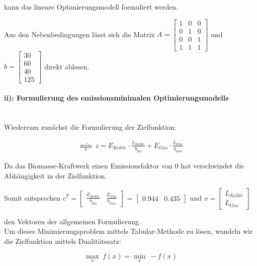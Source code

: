 \documentclass{eegreport}
\begin{document}
kann das lineare Optimierungsmodell formuliert werden.

Aus den Nebenbedingungen lässt sich die Matrix $A=\begin{bmatrix}
1 & 0 & 0 \\ 
0 & 1 & 0 \\ 
0 & 0 & 1 \\ 
1 & 1 & 1
\end{bmatrix}$ und $b=\begin{bmatrix}
30 \\ 
60 \\ 
40 \\ 
125
\end{bmatrix}$ direkt ablesen.




\paragraph{ii): Formulierung des emissionsminimalen Optimierungsmodells}\mbox{}\\


Wiederrum zunächst die Formulierung der Zielfunktion: 



\begin{align}
\min_{x}\ z = E_{Kohle} \cdot \frac{L_{Kohle}}{\eta_{Ko}} + E_{Gas} \cdot \frac{L_{Gas}}{\eta_{Gas}}
\end{align}

Da das Biomasse-Kraftwerk einen Emissionsfaktor von 0 hat verschwindet die Abhängigkeit in der Zielfunktion.

Somit entsprechen $c^T=\begin{bmatrix}
\frac{E_{Kohle}}{\eta_{Ko}} & \frac{E_{Gas}}{\eta_{Gas}}
\end{bmatrix}$ =
$\begin{bmatrix}
0.944 & 0.435
\end{bmatrix}$ 
 und $x=\begin{bmatrix}
 L_{Kohle} \\ 
 L_{Gas}
 \end{bmatrix}$

den Vektoren der allgemeinen Formulierung.\\

Um dieses Minimierungsproblem mittels Tabular-Methode zu lösen, wandeln wir die Zielfunktion mittels
Dualitätssatz:

\begin{equation}
\max_{x}\ f(x) = \min_{x}\ -f(x) 
\end{equation}
\end{document}

